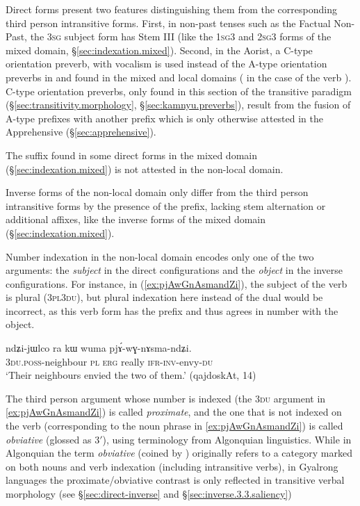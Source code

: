 Direct forms present two features distinguishing them from the corresponding third person intransitive forms. First, in non-past tenses such as the Factual Non-Past, the \textsc{3sg} subject form has Stem III (like the \textsc{1sg}\fl{}3 and \textsc{2sg}\fl{}3 forms of the mixed domain, §\ref{sec:indexation.mixed}). Second, in the Aorist, a C-type orientation preverb, with  vocalism is used instead of the A-type orientation preverbs in  and  found in the mixed and local domains ( in the case of the verb ). C-type orientation preverbs, only found in this section of the transitive paradigm (§\ref{sec:transitivity.morphology}, §\ref{sec:kamnyu.preverbs}), result from the fusion of A-type prefixes with another prefix which is only otherwise attested in the Apprehensive (§\ref{sec:apprehensive}). 

The  suffix found in some direct forms in the mixed domain (§\ref{sec:indexation.mixed}) is not attested in the non-local domain.

Inverse forms of the non-local domain only differ from the third person intransitive forms by the presence of the  prefix, lacking stem alternation or additional affixes, like the inverse forms of the mixed domain (§\ref{sec:indexation.mixed}).

Number indexation in the non-local domain encodes only one of the two arguments: the \textit{subject} in the direct configurations and the \textit{object} in the inverse configurations. For instance, in (\ref{ex:pjAwGnAsmandZi}), the subject of the verb  is plural (\textsc{3pl}\fl{}\textsc{3du}), but plural indexation  here instead of the dual would be incorrect, as this verb form has the  prefix and thus agrees in number with the object.

\begin{exe}
\ex   \label{ex:pjAwGnAsmandZi}
\gll ndʑi-jɯlco ra kɯ wuma pjɤ́-wɣ-nɤsma-ndʑi. \\
\textsc{3du}.\textsc{poss}-neighbour \textsc{pl} \textsc{erg} really \textsc{ifr}-\textsc{inv}-envy-\textsc{du} \\
\glt `Their neighbours envied the two of them.' (qajdoskAt, 14)
\end{exe}

The third person argument whose number is indexed (the \textsc{3du} argument in \ref{ex:pjAwGnAsmandZi}) is called \textit{proximate}, and the one that is not indexed on the verb (corresponding to the noun phrase  in \ref{ex:pjAwGnAsmandZi}) is called \textit{obviative} (glossed as 3$'$), using terminology from Algonquian linguistics. While in Algonquian the term \textit{obviative} (coined by \citealt{cuoq1866}) originally refers to a category marked on both nouns and verb indexation (including intransitive verbs), in Gyalrong languages the proximate/obviative contrast is only reflected in transitive verbal morphology (see §\ref{sec:direct-inverse} and §\ref{sec:inverse.3.3.saliency})

